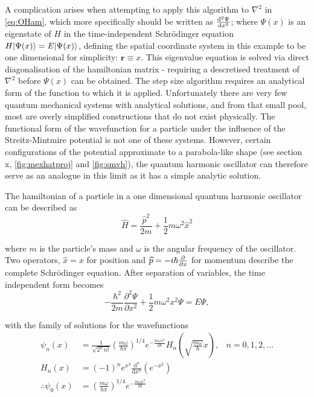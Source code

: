 A complication arises when attempting to apply this algorithm to $\nabla^2$ in \cref{eq:OHam}, which more specifically should be written as $\cramped{\frac{\mathrm{d}^2\Psi}{\mathrm{d}x^2}}$; where $\Psi(x)$ is an eigenstate of $H$ in the time-independent Schr\"odinger equation $H\lvert\Psi(x)\rangle = E\lvert\Psi(x)\rangle$, defining the spatial coordinate system in this example to be one dimensional for simplicity: $\mathbf{r} \equiv x$.
This eigenvalue equation is solved via direct diagonalisation of the hamiltonian matrix - requiring a descretised treatment of $\nabla^2$ before $\Psi(x)$ can be obtained.
The step size algorithm requires an analytical form of the function to which it is applied.
Unfortunately there are very few quantum mechanical systems with analytical solutions, and from that small pool, most are overly simplified constructions that do not exist physically.
The functional form of the wavefunction for a particle under the influence of the Streitz-Mintmire potential is not one of these systems.
However, certain configurations of the potential approximate to a parabola-like shape (see section x, \cref{fig:mexhatproj} and \cref{fig:smvh}), the quantum harmonic oscillator can therefore serve as an analogue in this limit as it has a simple analytic solution.

The hamiltonian of a particle in a one dimensional quantum harmonic oscillator can be described as
\begin{equation}
\widehat{H} = \frac{\widehat{p}^2}{2m}+\frac{1}{2}m\omega^2\widehat{x}^2\label{eq:hamho}
\end{equation}

where $m$ is the particle's mass and $ω$ is the angular frequency of the oscillator.
Two operators, $\widehat{x} = x$ for position and $\cramped{\widehat{p} = -i\hbar \frac{\partial}{\partial x}}$ for momentum describe the complete Schr\"{o}dinger equation.
After separation of variables, the time independent form becomes
\begin{equation}
-\frac{\hbar^2}{2m}\frac{\partial^2 \Psi}{\partial x^2}+\frac{1}{2}m\omega^2x^2 \Psi = E\Psi,
\label{eq:hamti}
\end{equation}

with the family of solutions for the wavefunctions
\begin{align}\psi_n(x) &= \frac{1}{\sqrt{2^n\,n!}}\left(\frac{m\omega}{\hbar\pi}\right)^{1/4}e^{
- \frac{m\omega x^2}{2 \hbar}} H_n\left(\sqrt{\frac{m\omega}{\hbar}} x \right), &n = 0,1,2,\ldots \\
H_n(x) &= (-1)^n e^{x^2}\frac{\mathrm{d}^n}{\mathrm{d}x^n}\left(e^{-x^2}\right) \\
\therefore \psi_0(x) &= \left(\frac{m\omega}{\hbar\pi}\right)^{1/4}e^{
- \frac{m\omega x^2}{2 \hbar}} \label{eq:gshwfn}
\end{align}

